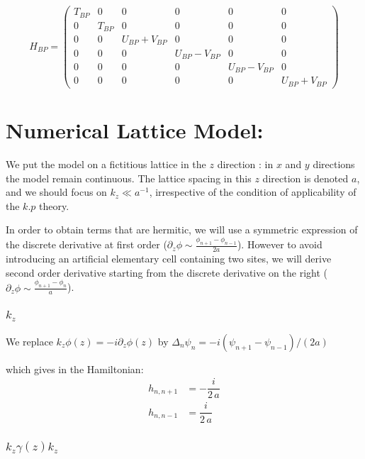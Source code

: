\documentclass[prb,aps]{revtex4}
\begin{document}
		\begin{equation}
			\label{eq:H-BP2}
			H_{BP}=
			\begin{pmatrix}
				T_{BP} & 0 & 0 &0 &0 &0     \\
				0 & T_{BP} & 0 & 0 &0 &0   \\
				0 & 0 & U_{BP}+V_{BP} & 0& 0 & 0  \\
				0 & 0 &0 & U_{BP}-V_{BP} & 0 & 0  \\
				0& 0 & 0& 0 & U_{BP}-V_{BP} &0 \\
				0 & 0 & 0 & 0 & 0 & U_{BP}+V_{BP}
			\end{pmatrix}
		\end{equation}


\section{Numerical Lattice Model:}

    We put the model on a fictitious lattice in the $z$ direction : in $x$ and $y$ directions the model remain continuous. The lattice spacing in this $z$ direction is denoted $a$, and we should focus on $k_z \ll a^{-1}$, irrespective of the condition of applicability of the $k.p$ theory.

    In order to obtain terms that are hermitic, we will use a symmetric expression of the discrete derivative at first order ($\partial_z ϕ \sim \frac{ϕ_{n+1} - ϕ_{n-1}}{2a}$). However to avoid introducing an artificial elementary cell containing two sites, we will derive second order derivative starting from the discrete derivative on the right ($\partial_z ϕ \sim \frac{ϕ_{n+1} - ϕ_{n}}{a}$).

    \subsubsection{$k_z$}

		We replace $k_z ϕ(z) = - i  \partial_{z} ϕ(z)  $ by $Δ_{n} ψ_{n} = -i (ψ_{n+1} - ψ_{n-1})/(2a)$

		which gives in the Hamiltonian:
		\begin{align}
		    h_{n, n+1} &= -\dfrac{i}{2\,a}\\
		    h_{n, n-1} &= \dfrac{i}{2\,a}
		\end{align}


    \subsubsection{$k_z γ(z) k_z$}
\end{document}
